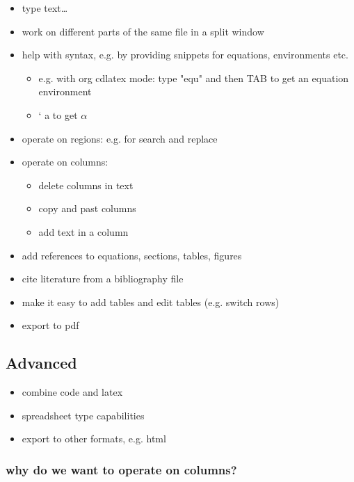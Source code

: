 \documentclass[11pt]{article}
\begin{document}
\begin{itemize}
\item type text\ldots{}
\item work on different parts of the same file in a split window
\item help with syntax, e.g. by providing snippets for equations, environments etc.
\begin{itemize}
\item e.g. with org cdlatex mode: type "equ" and then TAB to get an equation environment
\item ` a to get \(\alpha\)
\end{itemize}
\item operate on regions: e.g. for search and replace
\item operate on columns:
\begin{itemize}
\item delete columns in text
\item copy and past columns
\item add text in a column
\end{itemize}
\item add references to equations, sections, tables, figures
\item cite literature from a bibliography file
\item make it easy to add tables and edit tables (e.g. switch rows)
\item export to pdf
\end{itemize}

\subsection{Advanced}
\label{sec:orgdf7019f}

\begin{itemize}
\item combine code and latex
\item spreadsheet type capabilities
\item export to other formats, e.g. html
\end{itemize}


\subsubsection{why do we want to operate on columns?}
\label{sec:org531b277}
\end{document}
